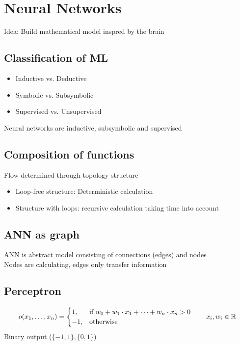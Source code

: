 

\section{Neural Networks}%
\label{nn:sec:neural_networks}
Idea: Build mathematical model inspred by the brain

\subsection{Classification of ML}%
\label{nn:sub:classification_of_ml}
\begin{itemize}
\item Inductive vs. Deductive
\item Symbolic vs. Subsymbolic
\item Supervised vs. Unsupervised
\end{itemize}
Neural networks are inductive, subsymbolic and supervised

\subsection{Composition of functions}%
\label{nn:sub:composition_of_functions}
Flow determined through topology structure
\begin{itemize}
\item Loop-free structure: Deterministic calculation
\item Structure with loops: recursive calculation taking time into account
\end{itemize}

\subsection{ANN as graph}%
\label{nn:sub:ann_as_graph}
ANN is abstract model consisting of connections (edges) and nodes\\
Nodes are calculating, edges only transfer information

\subsection{Perceptron}%
\label{nn:sub:perceptron}
\[
  o(x_1, \ldots, x_n) = \begin{cases}1, & \text{if } w_0 + w_1 \cdot x_1 + \cdots + w_n \cdot x_n > 0\\
    -1, & \text{otherwise}\end{cases}
  \qquad x_i, w_i \in \mathbb{R}
\]
Binary output (\(\{-1, 1\}, \{0, 1\}\))

